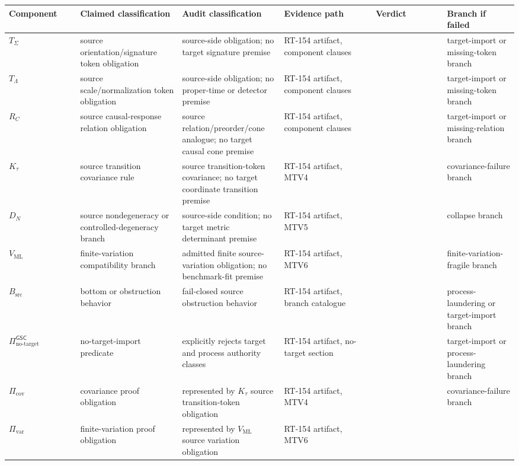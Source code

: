 \documentclass[11pt]{article}
\newcommand{\NoTarget}{\Pi_{\mathrm{no\mbox{-}target}}^{\mathsf{GSC}}}
\newcommand{\Pass}{\mathrm{pass\_no\_smuggling\_detected}}
\begin{document}
\begin{longtable}{p{0.14\linewidth}p{0.20\linewidth}p{0.20\linewidth}p{0.18\linewidth}p{0.14\linewidth}p{0.14\linewidth}}
\toprule
Component & Claimed classification & Audit classification & Evidence path & Verdict & Branch if failed \\
\midrule
\(T_{\Sigma}\) &
source orientation/signature token obligation &
source-side obligation; no target signature premise &
RT-154 artifact, component clauses &
\Pass &
target-import or missing-token branch \\
\(T_{\Lambda}\) &
source scale/normalization token obligation &
source-side obligation; no proper-time or detector premise &
RT-154 artifact, component clauses &
\Pass &
target-import or missing-token branch \\
\(R_C\) &
source causal-response relation obligation &
source relation/preorder/cone analogue; no target causal cone premise &
RT-154 artifact, component clauses &
\Pass &
target-import or missing-relation branch \\
\(K_{\tau}\) &
source transition covariance rule &
source transition-token covariance; no target coordinate transition premise &
RT-154 artifact, MTV4 &
\Pass &
covariance-failure branch \\
\(D_N\) &
source nondegeneracy or controlled-degeneracy branch &
source-side condition; no target metric determinant premise &
RT-154 artifact, MTV5 &
\Pass &
collapse branch \\
\(V_{\mathrm{ML}}\) &
finite-variation compatibility branch &
admitted finite source-variation obligation; no benchmark-fit premise &
RT-154 artifact, MTV6 &
\Pass &
finite-variation-fragile branch \\
\(B_{\mathrm{src}}\) &
bottom or obstruction behavior &
fail-closed source obstruction behavior &
RT-154 artifact, branch catalogue &
\Pass &
process-laundering or target-import branch \\
\(\NoTarget\) &
no-target-import predicate &
explicitly rejects target and process authority classes &
RT-154 artifact, no-target section &
\Pass &
target-import or process-laundering branch \\
\(\Pi_{\mathrm{cov}}\) &
covariance proof obligation &
represented by \(K_{\tau}\) source transition-token obligation &
RT-154 artifact, MTV4 &
\Pass &
covariance-failure branch \\
\(\Pi_{\mathrm{var}}\) &
finite-variation proof obligation &
represented by \(V_{\mathrm{ML}}\) source variation obligation &
RT-154 artifact, MTV6 &

\end{longtable}
\end{document}
